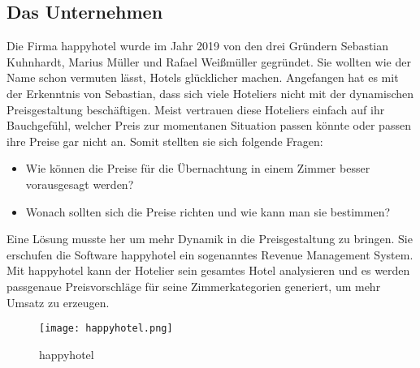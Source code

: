 \subsection{Das Unternehmen}
\label{subsec:Unternehmen}
Die Firma happyhotel wurde im Jahr 2019 von den drei Gründern Sebastian Kuhnhardt, Marius Müller und Rafael Weißmüller gegründet. Sie wollten wie der Name schon vermuten lässt, Hotels glücklicher machen. Angefangen hat es mit der Erkenntnis von Sebastian,  dass sich viele Hoteliers nicht mit der dynamischen Preisgestaltung beschäftigen. Meist vertrauen diese Hoteliers einfach auf ihr Bauchgefühl, welcher Preis zur momentanen Situation passen könnte oder passen ihre Preise gar nicht an. 
\newline
\newline
Somit stellten sie sich folgende Fragen: 
\begin{itemize}
    \item Wie können die Preise für die Übernachtung in einem Zimmer besser vorausgesagt werden?
    \item Wonach sollten sich die Preise richten und wie kann man sie bestimmen?
\end{itemize}

Eine Lösung musste her um mehr Dynamik in die Preisgestaltung zu bringen. Sie erschufen die Software happyhotel ein sogenanntes Revenue Management System. Mit happyhotel kann der Hotelier sein gesamtes Hotel analysieren und es werden passgenaue Preisvorschläge für seine Zimmerkategorien generiert, um mehr Umsatz zu erzeugen.
\begin{figure}[h]
    \centering
    \texttt{[image: happyhotel.png]}
    \caption[happyhotel]{happyhotel}
    \label{img:happyhotel}
\end{figure}
